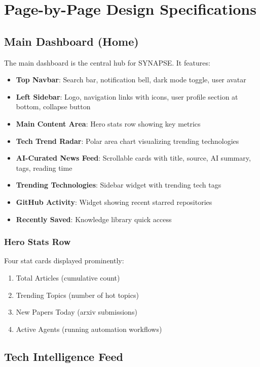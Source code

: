\documentclass{report}
\begin{document}
\chapter{Page-by-Page Design Specifications}

\section{Main Dashboard (Home)}

The main dashboard is the central hub for SYNAPSE. It features:

\begin{itemize}
    \item \textbf{Top Navbar}: Search bar, notification bell, dark mode toggle, user avatar
    \item \textbf{Left Sidebar}: Logo, navigation links with icons, user profile section at bottom, collapse button
    \item \textbf{Main Content Area}: Hero stats row showing key metrics
    \item \textbf{Tech Trend Radar}: Polar area chart visualizing trending technologies
    \item \textbf{AI-Curated News Feed}: Scrollable cards with title, source, AI summary, tags, reading time
    \item \textbf{Trending Technologies}: Sidebar widget with trending tech tags
    \item \textbf{GitHub Activity}: Widget showing recent starred repositories
    \item \textbf{Recently Saved}: Knowledge library quick access
\end{itemize}

\subsection{Hero Stats Row}

Four stat cards displayed prominently:
\begin{enumerate}
    \item Total Articles (cumulative count)
    \item Trending Topics (number of hot topics)
    \item New Papers Today (arxiv submissions)
    \item Active Agents (running automation workflows)
\end{enumerate}

\section{Tech Intelligence Feed}
\end{document}
